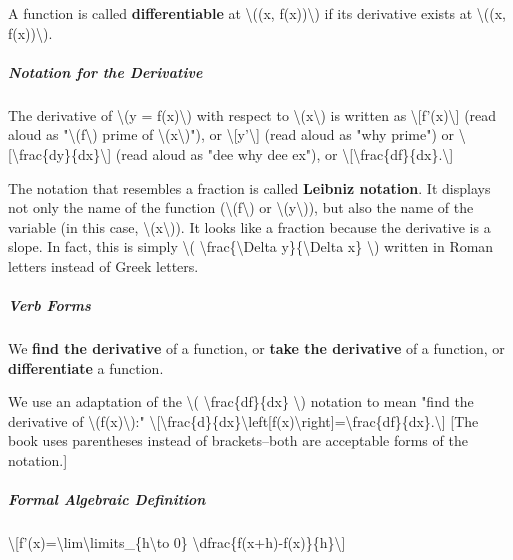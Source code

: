 A function is called \textbf{differentiable} at \textbackslash{}((x,
f(x))\textbackslash{}) if its derivative exists at \textbackslash{}((x,
f(x))\textbackslash{}).

\hypertarget{notation-for-the-derivative}{%
\subparagraph{Notation for the
Derivative}\label{notation-for-the-derivative}}

The derivative of \textbackslash{}(y = f(x)\textbackslash{}) with
respect to \textbackslash{}(x\textbackslash{}) is written as
\textbackslash{}{[}f'(x)\textbackslash{}{]} (read aloud as
"\textbackslash{}(f\textbackslash{}) prime of
\textbackslash{}(x\textbackslash{})"), or
\textbackslash{}{[}y'\textbackslash{}{]} (read aloud as "why prime") or
\textbackslash{}{[}\textbackslash{}frac\{dy\}\{dx\}\textbackslash{}{]}
(read aloud as "dee why dee ex"), or
\textbackslash{}{[}\textbackslash{}frac\{df\}\{dx\}.\textbackslash{}{]}

The notation that resembles a fraction is called \textbf{Leibniz
notation}. It displays not only the name of the function
(\textbackslash{}(f\textbackslash{}) or
\textbackslash{}(y\textbackslash{})), but also the name of the variable
(in this case, \textbackslash{}(x\textbackslash{})). It looks like a
fraction because the derivative is a slope. In fact, this is simply
\textbackslash{}( \textbackslash{}frac\{\textbackslash{}Delta
y\}\{\textbackslash{}Delta x\} \textbackslash{}) written in Roman
letters instead of Greek letters.

\hypertarget{verb-forms}{%
\subparagraph{Verb Forms}\label{verb-forms}}

We \textbf{find the derivative} of a function, or \textbf{take the
derivative} of a function, or \textbf{differentiate} a function.

We use an adaptation of the \textbackslash{}(
\textbackslash{}frac\{df\}\{dx\} \textbackslash{}) notation to mean
"find the derivative of \textbackslash{}(f(x)\textbackslash{}):"
\textbackslash{}{[}\textbackslash{}frac\{d\}\{dx\}\textbackslash{}left{[}f(x)\textbackslash{}right{]}=\textbackslash{}frac\{df\}\{dx\}.\textbackslash{}{]}
{[}The book uses parentheses instead of brackets--both are acceptable
forms of the notation.{]}

\hypertarget{formal-algebraic-definition}{%
\subparagraph{Formal Algebraic
Definition}\label{formal-algebraic-definition}}

\textbackslash{}{[}f'(x)=\textbackslash{}lim\textbackslash{}limits\_\{h\textbackslash{}to
0\} \textbackslash{}dfrac\{f(x+h)-f(x)\}\{h\}\textbackslash{}{]}

